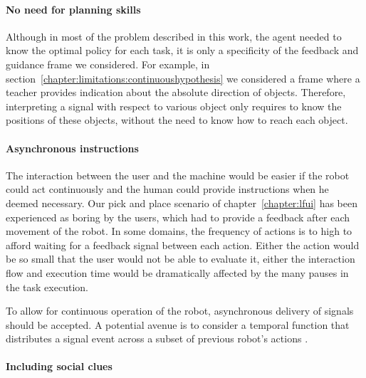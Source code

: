 \paragraph{No need for planning skills}

Although in most of the problem described in this work, the agent needed to know the optimal policy for each task, it is only a specificity of the feedback and guidance frame we considered. For example, in section~\ref{chapter:limitations:continuoushypothesis} we considered a frame where a teacher provides indication about the absolute direction of objects. Therefore, interpreting a signal with respect to various object only requires to know the positions of these objects, without the need to know how to reach each object.


\paragraph{Asynchronous instructions}

The interaction between the user and the machine would be easier if the robot could act continuously and the human could provide instructions when he deemed necessary. Our pick and place scenario of chapter~\ref{chapter:lfui} has been experienced as boring by the users, which had to provide a feedback after each movement of the robot. In some domains, the frequency of actions is to high to afford waiting for a feedback signal between each action. Either the action would be so small that the user would not be able to evaluate it, either the interaction flow and execution time would be dramatically affected by the many pauses in the task execution.

To allow for continuous operation of the robot, asynchronous delivery of signals should be accepted. A potential avenue is to consider a temporal function that distributes a signal event across a subset of previous robot's actions \cite{hockley1984analysis,knox2009interactively}. 


\paragraph{Including social clues}

